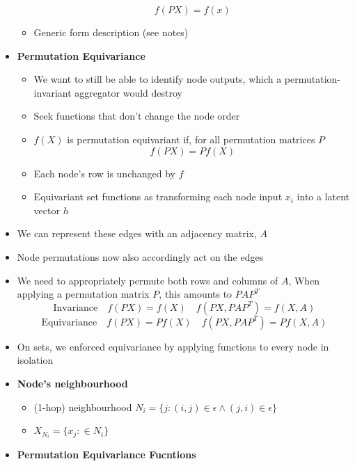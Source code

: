 \begin{itemize}
\begin{itemize}
        \[f(PX) = f(x)\]
        \item Generic form description (see notes)
    \end{itemize}
    \item \textbf{Permutation Equivariance}
    \begin{itemize}
        \item We want to still be able to identify node outputs, which a permutation-invariant aggregator would destroy
        \item Seek functions that don’t change the node order
        \item \(f(X)\) is permutation equivariant if, for all permutation 
        matrices \(P\)
        \[f(PX) = Pf(X)\]
        \item Each node’s row is unchanged by \(f\)
        \item Equivariant set functions as transforming each node input \(x_i\) into a latent vector \(h\)
    \end{itemize}
    \item We can represent these edges with an adjacency matrix, \(A\)
    \item Node permutations now also accordingly act on the edges
    \item We need to appropriately permute both rows and columns of \(A\), When applying a permutation matrix \(P\), this amounts to \(PAP^T\)
    \[\text{Invariance} \quad f(PX) = f(X) \quad f(PX, PAP^T) = f(X,A)\]
    \[\text{Equivariance} \quad f(PX) = Pf(X) \quad f(PX, PAP^T) = Pf(X,A)\]
    \item On sets, we enforced equivariance by applying functions to every node in isolation
    \item \textbf{Node’s neighbourhood}
    \begin{itemize}
        \item (1-hop) neighbourhood
        $N_i = \{j : (i,j) \in \epsilon \land (j, i) \in \epsilon \}$
        \item $X_{N_i} = \{x_j : \in N_i\}$
    \end{itemize}
    \item \textbf{Permutation Equivariance Fucntions}
\end{itemize}

